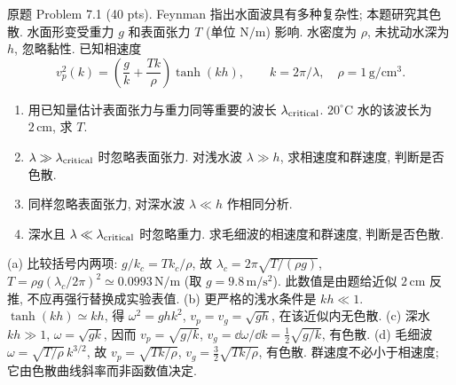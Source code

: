 \begin{exercise}\label{ps:7.1}
原题 Problem 7.1 (40 pts). Feynman 指出水面波具有多种复杂性; 本题研究其色散. 水面形变受重力 $g$ 和表面张力 $T$ (单位 $\mathrm{N/m}$) 影响. 水密度为 $\rho$, 未扰动水深为 $h$, 忽略黏性. 已知相速度
\[
v_p^2(k)=\left(\frac gk+\frac{Tk}{\rho}\right)\tanh(kh),\qquad k=2\pi/\lambda,
\quad \rho=1\,\mathrm{g/cm^3}.
\]
\begin{enumerate}[label=\alph*.]
\item 用已知量估计表面张力与重力同等重要的波长 $\lambda_{\rm critical}$. $20^\circ\mathrm C$ 水的该波长为 $2\,\mathrm{cm}$, 求 $T$.
\item $\lambda\gg\lambda_{\rm critical}$ 时忽略表面张力. 对浅水波 $\lambda\gg h$, 求相速度和群速度, 判断是否色散.
\item 同样忽略表面张力, 对深水波 $\lambda\ll h$ 作相同分析.
\item 深水且 $\lambda\ll\lambda_{\rm critical}$ 时忽略重力. 求毛细波的相速度和群速度, 判断是否色散.
\end{enumerate}
\end{exercise}
\begin{solution}
(a) 比较括号内两项: $g/k_c=Tk_c/\rho$, 故
$\lambda_c=2\pi\sqrt{T/(\rho g)}$,
$T=\rho g(\lambda_c/2\pi)^2\simeq0.0993\,\mathrm{N/m}$ (取 $g=9.8\,\mathrm{m/s^2}$). 此数值是由题给近似 $2\,\mathrm{cm}$ 反推, 不应再强行替换成实验表值.
(b) 更严格的浅水条件是 $kh\ll1$. $\tanh(kh)\simeq kh$, 得 $\omega^2=ghk^2$, $v_p=v_g=\sqrt{gh}$, 在该近似内无色散.
(c) 深水 $kh\gg1$, $\omega=\sqrt{gk}$, 因而
$v_p=\sqrt{g/k}$, $v_g=\dd\omega/\dd k=\tfrac12\sqrt{g/k}$, 有色散.
(d) 毛细波 $\omega=\sqrt{T/\rho}\,k^{3/2}$, 故
$v_p=\sqrt{Tk/\rho}$, $v_g=\tfrac32\sqrt{Tk/\rho}$, 有色散. 群速度不必小于相速度; 它由色散曲线斜率而非函数值决定.
\end{solution}

